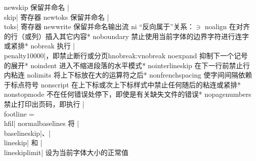 \capcs newskip {保留并命名 |\\skip| 寄存器}{}{\@newskip}
\capcs newtoks {保留并命名 |\\toks| 寄存器}{}{\@newtoks}
\capcs newwrite {保留并命名输出流}{}{\@newwrite}
\capcs ni {“反向属于”关系：$\ni$}{}{}
\capcs noalign {在对齐的行（或列）插入其它内容}*{}
\capcs noboundary {禁止使用当前字体的边界字符进行连字或紧排}*{}
\capcstwo nobreak {执行 |\\penalty10000|，即禁止断行或分页}{}{hnobreak:vnobreak}
\capcs noexpand {抑制下一个记号的展开}*{}
\capcs noindent {进入不缩进段落的水平模式}*{}
\capcs nointerlineskip {在下一行前禁止行内粘连}{}{}
\capcs nolimits {将上下标放在大的运算符之后}*{}
\capcs nonfrenchspacing {使字间间隔依赖于标点符号}{}{}
\capcs nonscript {在上下标或次上下标样式中禁止任何随后的粘连或紧排}*{}
\capcs nonstopmode {不在任何错误处停下，即使是有关缺失文件的错误}*{}
\capcs nopagenumbers {禁止打印出页码，即执行 |\\footline = {\\hfil}|}{}{}
\capcs normalbaselines {将 |\\baselineskip|、|\\line\-skip| 和 |\\line\-skip\-limit| 设为当前字体大小的正常值}{}{}
